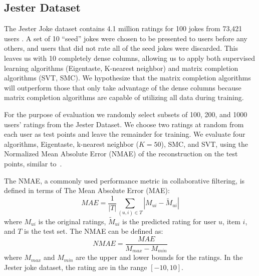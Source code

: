 \documentclass{article} %
\begin{document}
\subsection{Jester Dataset}

The Jester Joke dataset contains 4.1 million ratings for 100 jokes
from 73,421 users \cite{r30}. A set of 10 ``seed'' jokes were chosen
to be presented to users before any others, and users that did not
rate all of the seed jokes were discarded. This leaves us with 10
completely dense columns, allowing us to apply both supervised
learning algorithms (Eigentaste, K-nearest neighbor) and matrix
completion algorithms (SVT, SMC). We hypothesize that the matrix
completion algorithms will outperform those that only take advantage
of the dense columns because matrix completion algorithms are capable
of utilizing all data during training.

For the purpose of evaluation we randomly select subsets of 100, 200,
and 1000 users' ratings from the Jester Dataset. We choose two ratings
at random from each user as test points and leave the remainder for
training. We evaluate four algorithms, Eigentaste, k-nearest neighbor
($K = 50$), SMC, and SVT, using the Normalized Mean Absolute Error
(NMAE) of the reconstruction on the test points, similar
to~\cite{oh2010thesis}.

The NMAE, a commonly used performance metric in collaborative
filtering, is defined in terms of The Mean Absolute Error (MAE):
\begin{equation}
MAE = \frac{1}{|T|}\sum\limits_{(u,i) \in T} |M_{ui} - \widetilde{M}_{ui}|
\end{equation}
where $M_{ui}$ is the original ratings, $\widetilde{M}_{ui}$ is the
predicted rating for user $u$, item $i$, and $T$ is the test set. The
NMAE can be defined as:
\begin{equation}
NMAE = \frac{MAE}{M_{max}-M_{min}}
\end{equation}
where $M_{max}$ and $M_{min}$ are the upper and lower bounds for the
ratings. In the Jester joke dataset, the rating are in the range
$[-10,10]$.

\end{document}
